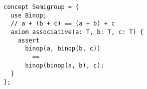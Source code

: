 \begin{verbatim}
concept Semigroup = {
  use Binop;
  // a + (b + c) == (a + b) + c
  axiom associative(a: T, b: T, c: T) {
    assert
      binop(a, binop(b, c))
        ==
      binop(binop(a, b), c);
  }
};
\end{verbatim}
